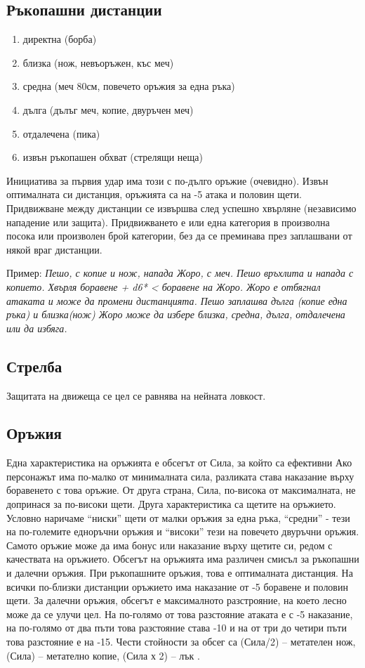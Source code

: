 \subsection{Ръкопашни дистанции}
\begin{enumerate}
\item{директна (борба)}
\item{близка (нож, невъоръжен, къс меч)}
\item{средна (меч 80см, повечето оръжия за една ръка)}
\item{дълга (дълъг меч, копие, двуръчен меч)}
\item{отдалечена (пика)}
\item{извън ръкопашен обхват (стрелящи неща)}
\end{enumerate}
Инициатива за първия удар има този с по-дълго оръжие (очевидно).
Извън оптималната си дистанция, оръжията са на -5 атака и половин щети.
Придвижване между дистанции се извършва след успешно хвърляне (независимо нападение или защита).
Придвижването е или една категория в произволна посока или произволен брой категории, без да се преминава през заплашвани от някой враг дистанции. 

Пример:
\emph{Пешо, с копие и нож, напада Жоро, с меч.
Пешо връхлита и напада с копието.
Хвърля боравене + d6* < боравене на Жоро.
Жоро е отбягнал атаката и може да промени дистанцията.
Пешо заплашва дълга (копие една ръка) и близка(нож)
Жоро може да избере близка, средна, дълга, отдалечена или да избяга.
}

\subsection{Стрелба}
Защитата на движеща се цел се равнява на нейната ловкост.

\subsection{Оръжия}
Една характеристика на оръжията е обсегът от Сила, за който са ефективни
Ако персонажът има по-малко от минималната сила, разликата става наказание върху боравенето с това оръжие.
От друга страна, Сила, по-висока от максималната, не допринася за по-високи щети.
Друга характеристика са щетите на оръжието. Условно наричаме “ниски” щети от малки оръжия за една ръка, “средни” - тези на по-големите едноръчни оръжия и “високи” тези на повечето двуръчни оръжия.
Самото оръжие може да има бонус или наказание върху щетите си, редом с качествата на оръжието.
Обсегът на оръжията има различен смисъл за ръкопашни и далечни оръжия.
При ръкопашните оръжия, това е оптималната дистанция.
На всички по-близки дистанции оръжието има наказание от -5 боравене и половин щети.
За далечни оръжия, обсегът е максималното разстрояние, на което лесно може да се улучи цел.
На по-голямо от това разстояние атаката е с -5 наказание, на по-голямо от два пъти това разстояние става -10 и на от три до четири пъти това разстояние е на -15.
Чести стойности за обсег са (Сила/2) – метателен нож, (Сила) – метателно копие, (Сила х 2) – лък .

